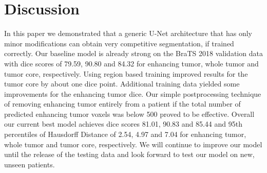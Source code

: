 \documentclass{templates/llncs} %
\begin{document}
\section{Discussion}
  In this paper we demonstrated that a generic U-Net architecture that has only minor modifications can obtain very competitive segmentation, if trained correctly. Our baseline model is already strong on the BraTS 2018 validation data with dice scores of 79.59, 90.80 and 84.32 for enhancing tumor, whole tumor and tumor core, respectively. Using region based training improved results for the tumor core by about one dice point. Additional training data yielded some improvements for the enhancing tumor dice. Our simple postprocessing technique of removing enhancing tumor entirely from a patient if the total number of predicted enhancing tumor voxels was below 500 proved to be effective. Overall our current best model achieves dice scores 81.01, 90.83 and 85.44 and 95th percentiles of Hausdorff Distance of 2.54, 4.97 and 7.04 for enhancing tumor, whole tumor and tumor core, respectively. We will continue to improve our model until the release of the testing data and look forward to test our model on new, unseen patients.
  
	


\end{document}
